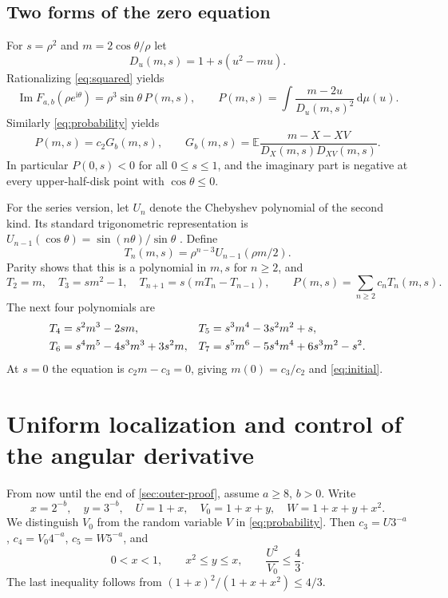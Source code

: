 \documentclass[11pt,letterpaper]{article}
\numberwithin{equation}{section}
\theoremstyle{definition}
\theoremstyle{remark}
\DeclareMathOperator{\Imn}{Im}
\newcommand{\E}{\mathbb E}
\newcommand{\dd}{\,\mathrm d}
\newcommand{\ii}{\mathrm i}
\begin{document}
\subsection{Two forms of the zero equation}
For $s=\rho^2$ and $m=2\cos\theta/\rho$ let
\begin{equation}\label{eq:D}
 D_u(m,s)=1+s(u^2-mu).
\end{equation}
Rationalizing \eqref{eq:squared} yields
\begin{equation}\label{eq:P-integral}
 \Imn F_{a,b}(\rho e^{\ii\theta})
 =\rho^3\sin\theta\,P(m,s),\qquad
 P(m,s)=\int\frac{m-2u}{D_u(m,s)^2}\dd\mu(u).
\end{equation}
Similarly \eqref{eq:probability} yields
\begin{equation}\label{eq:G-b}
 P(m,s)=c_2G_b(m,s),\qquad
 G_b(m,s)=\E\frac{m-X-XV}{D_X(m,s)D_{XV}(m,s)}.
\end{equation}
In particular $P(0,s)<0$ for all $0\le s\le1$, and the imaginary part
is negative at every upper-half-disk point with $\cos\theta\le0$.

For the series version, let $U_n$ denote the Chebyshev polynomial of the
second kind. Its standard trigonometric representation is
$U_{n-1}(\cos\theta)=\sin(n\theta)/\sin\theta$
\cite{dlmf-chebyshev}. Define
\begin{equation}\label{eq:T-def}
 T_n(m,s)=\rho^{n-3}U_{n-1}(\rho m/2).
\end{equation}
Parity shows that this is a polynomial in $m,s$ for $n\ge2$, and
\begin{equation}\label{eq:T-recurrence}
 T_2=m,\quad T_3=sm^2-1,\quad
 T_{n+1}=s(mT_n-T_{n-1}),\qquad
 P(m,s)=\sum_{n\ge2}c_nT_n(m,s).
\end{equation}
The next four polynomials are
\begin{align}\label{eq:T-low}
 T_4&=s^2m^3-2sm,&
 T_5&=s^3m^4-3s^2m^2+s,\notag\\
 T_6&=s^4m^5-4s^3m^3+3s^2m,&
 T_7&=s^5m^6-5s^4m^4+6s^3m^2-s^2.
\end{align}
At $s=0$ the equation is $c_2m-c_3=0$, giving
$m(0)=c_3/c_2$ and \eqref{eq:initial}.

\section{Uniform localization and control of the angular derivative}
\label{sec:localization}
From now until the end of \cref{sec:outer-proof}, assume $a\ge8$, $b>0$.
Write
\begin{equation}\label{eq:UVW}
 x=2^{-b},\quad y=3^{-b},\quad
 U=1+x,\quad V_0=1+x+y,\quad W=1+x+y+x^2.
\end{equation}
We distinguish $V_0$ from the random variable $V$ in
\eqref{eq:probability}. Then
$c_3=U3^{-a}$, $c_4=V_0 4^{-a}$, $c_5=W5^{-a}$, and
\begin{equation}\label{eq:xy}
 0<x<1,\qquad x^2\le y\le x,\qquad
 \frac{U^2}{V_0}\le\frac43.
\end{equation}
The last inequality follows from
$(1+x)^2/(1+x+x^2)\le4/3$.
\end{document}
